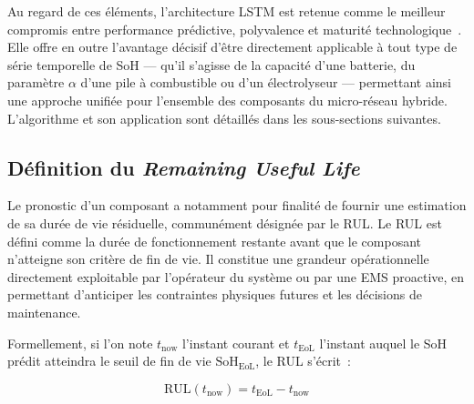 Au regard de ces éléments, l'architecture LSTM est retenue comme le meilleur compromis entre performance prédictive, polyvalence et maturité technologique~\cite{chandra_evaluation_2021}. Elle offre en outre l'avantage décisif d'être directement applicable à tout type de série temporelle de SoH — qu'il s'agisse de la capacité d'une batterie, du paramètre $\alpha$ d'une pile à combustible ou d'un électrolyseur — permettant ainsi une approche unifiée pour l'ensemble des composants du micro-réseau hybride. L'algorithme et son application sont détaillés dans les sous-sections suivantes.

\subsection{Définition du \textit{Remaining Useful Life}}
%
%
Le pronostic d'un composant a notamment pour finalité de fournir une estimation de sa durée de vie résiduelle, communément désignée par le RUL. Le RUL est défini comme la durée de fonctionnement restante avant que le composant n'atteigne son critère de fin de vie. Il constitue une grandeur opérationnelle directement exploitable par l'opérateur du système ou par une EMS proactive, en permettant d'anticiper les contraintes physiques futures et les décisions de maintenance.

Formellement, si l'on note $t_{\text{now}}$ l'instant courant et $t_{\text{EoL}}$ l'instant auquel le SoH prédit atteindra le seuil de fin de vie $\text{SoH}_{\text{EoL}}$, le RUL s'écrit~:

\begin{equation}
    \text{RUL}(t_{\text{now}}) = t_{\text{EoL}} - t_{\text{now}}
    \label{eq:rul_definition}
\end{equation}

